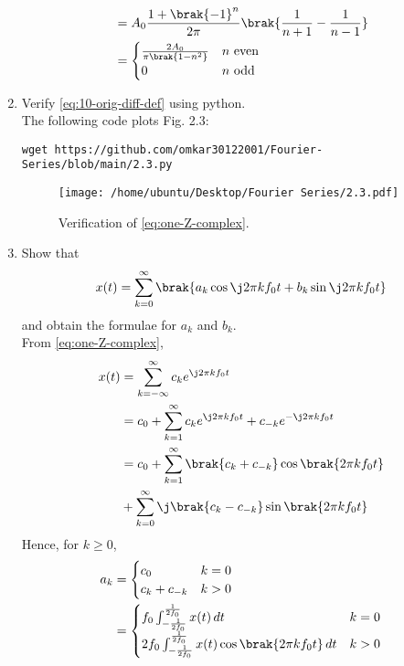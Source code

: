 \documentclass[journal,12pt,twocolumn]{IEEEtran}
\renewcommand\thesection{\arabic{section}}
\begin{document}
\begin{enumerate}[label=\thesection.\arabic*,ref=\thesection.\theenumi]
\begin{align}
	&= A_0\frac{1+\brak{-1}^n}{2\pi}\brak{\frac{1}{n+1} - \frac{1}{n-1}} \\
	&= 
	\begin{cases}
		\frac{2A_0}{\pi\brak{1-n^2}} & n\ \text{even} \\
		0 & n\ \text{odd}
	\end{cases}
	\label{eq:ck-xt}
\end{align}
\item Verify 
\eqref{eq:10-orig-diff-def}
using python. \\
\solution
The following code plots Fig. 2.3:
\begin{lstlisting}
wget https://github.com/omkar30122001/Fourier-Series/blob/main/2.3.py
\end{lstlisting}
\begin{figure}[!ht]
	\texttt{[image: /home/ubuntu/Desktop/Fourier Series/2.3.pdf]}
	\caption{Verification of \eqref{eq:one-Z-complex}.}
	\label{fig:ver-complex}
\end{figure}
\item Show that 
\begin{align}
	x(t) = \sum_{k = 0}^{\infty}\brak{a_k\cos{\j2\pi kf_0 t}+b_k\sin{\j2\pi kf_0 t}}
	\label{eq:one-Z-real}
\end{align}
and obtain the formulae for $a_k$ and $b_k$. \\
\solution From \eqref{eq:one-Z-complex},
\begin{align}
	x(t) &= \sum_{k = -\infty}^{\infty}c_ke^{\j2\pi kf_0 t} \\
	&= c_0 + \sum_{k = 1}^{\infty}c_ke^{\j2\pi kf_0t} + c_{-k}e^{-\j2\pi kf_0t} \\
	&= c_0 + \sum_{k = 1}^{\infty}\brak{c_k + c_{-k}}\cos\brak{2\pi kf_0t}  \nonumber \\
	&+ \sum_{k = 0}^{\infty}\j\brak{c_k - c_{-k}}\sin\brak{2\pi kf_0t}
\end{align}
Hence, for $k \ge 0$,
\begin{align}
	a_k &= 
	\begin{cases}
		c_0 & k = 0 \\
		c_k + c_{-k} & k > 0
	\end{cases} \label{eq:ak} \\
	&=
	\begin{cases}
		f_0\int_{-\frac{1}{2f_0}}^{\frac{1}{2f_0}}x(t)\, dt & k = 0 \\
		2f_0\int_{-\frac{1}{2f_0}}^{\frac{1}{2f_0}}
		x(t)\cos\brak{2\pi kf_0t}\, dt & k > 0
	\end{cases} \\

\end{align}
\end{enumerate}
\end{document}
